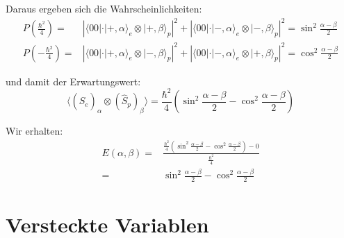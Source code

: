 \documentclass[11pt, ngerman, fleqn, DIV=15, headinclude]{scrartcl}
\begin{document}
	Daraus ergeben sich die Wahrscheinlichkeiten:
	\begin{align*}
		P\left(\frac{\hbar^2}{4}\right)=&\left|\langle00|\cdot |+,\alpha\rangle_e\otimes|+,\beta\rangle_p\right|^2+\left|\langle00|\cdot |-,\alpha\rangle_e\otimes|-,\beta\rangle_p\right|^2 = \sin^2\frac{\alpha-\beta}{2} \\
		P\left(-\frac{\hbar^2}{4}\right)=&\left|\langle00|\cdot |+,\alpha\rangle_e\otimes|-,\beta\rangle_p\right|^2+\left|\langle00|\cdot |-,\alpha\rangle_e\otimes|+,\beta\rangle_p\right|^2=\cos^2\frac{\alpha-\beta}{2} 
	\end{align*}
	
	und damit der Erwartungswert:
	\begin{equation*}
		\langle(\hat{S}_e)_\alpha\otimes(\hat{S}_p)_\beta\rangle=\frac{\hbar^2}{4}\left(\sin^2\frac{\alpha-\beta}{2}-\cos^2\frac{\alpha-\beta}{2} \right)
	\end{equation*}

	Wir erhalten:
	\begin{align*}
		E(\alpha,\beta)=&\frac{\frac{\hbar^2}{4}\left(\sin^2\frac{\alpha-\beta}{2}-\cos^2\frac{\alpha-\beta}{2} \right)-0}{\frac{\hbar^2}{4}} \\
			=&\sin^2\frac{\alpha-\beta}{2}-\cos^2\frac{\alpha-\beta}{2}
	\end{align*}

\section{Versteckte Variablen}
\end{document}

